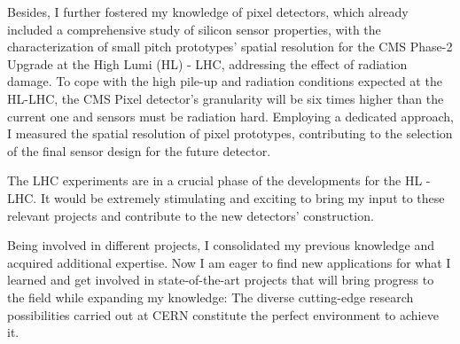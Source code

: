 {Besides, I further fostered my knowledge of pixel detectors, which already included a comprehensive study of silicon sensor properties, with the characterization of small pitch prototypes' spatial resolution for the CMS Phase-2 Upgrade at the High Lumi (HL) - LHC, addressing the effect of radiation damage. To cope with the high pile-up and radiation conditions expected at the HL-LHC, the CMS Pixel detector's granularity will be six times higher than the current one and sensors must be radiation hard. Employing a dedicated approach, I measured the spatial resolution of pixel prototypes, contributing to the selection of the final sensor design for the future detector.


The LHC experiments are in a crucial phase of the developments for the HL - LHC.  It would be extremely stimulating and exciting to bring my input to these relevant projects and contribute to the new detectors' construction. 

 Being involved in different projects, I consolidated my previous knowledge and acquired additional expertise. Now I am eager to find new applications for what I learned and get involved in state-of-the-art projects that will bring progress to the field while expanding my knowledge: The diverse cutting-edge research possibilities carried out at CERN constitute the perfect environment to achieve it. 









}
